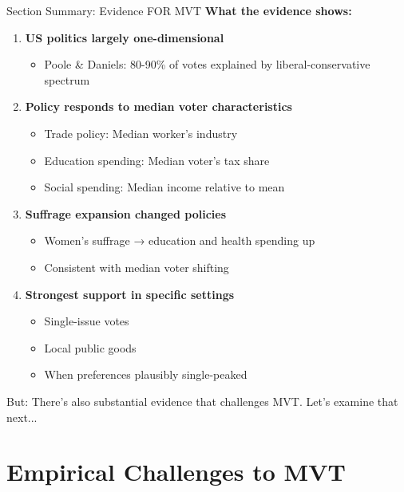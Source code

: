 \documentclass[10pt]{beamer}
\begin{document}
\begin{frame}{Section Summary: Evidence FOR MVT}
\textbf{What the evidence shows:}

\begin{enumerate}
\item \textbf{US politics largely one-dimensional}
\begin{itemize}
\item Poole \& Daniels: 80-90\% of votes explained by liberal-conservative spectrum
\end{itemize}


\item \textbf{Policy responds to median voter characteristics}
\begin{itemize}
\item Trade policy: Median worker's industry
\item Education spending: Median voter's tax share
\item Social spending: Median income relative to mean
\end{itemize}


\item \textbf{Suffrage expansion changed policies}
\begin{itemize}
\item Women's suffrage → education and health spending up
\item Consistent with median voter shifting
\end{itemize}


\item \textbf{Strongest support in specific settings}
\begin{itemize}
\item Single-issue votes
\item Local public goods
\item When preferences plausibly single-peaked
\end{itemize}
\end{enumerate}



\alert{But:} There's also substantial evidence that challenges MVT. Let's examine that next...
\end{frame}


\section{Empirical Challenges to MVT}
\end{document}
